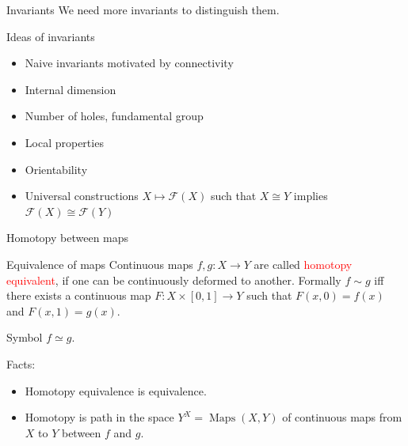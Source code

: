\documentclass[10pt]{beamer}
\DeclareMathOperator{\Maps}{Maps}
\begin{document}
\begin{frame}{Invariants}
We need more invariants to distinguish them.

\end{frame}


\begin{frame}{Ideas of invariants}

\begin{itemize}
  \item Naive invariants motivated by connectivity \pause
  \item Internal dimension \pause
  \item Number of holes, fundamental group \pause
  \item Local properties \pause
  \item Orientability \pause
  \item Universal constructions $X\mapsto \mathcal{F}(X)$ such that $X\cong Y$ implies $\mathcal{F}(X)\cong \mathcal{F}(Y)$
\end{itemize}

\end{frame}

\begin{frame}{Homotopy between maps}

\begin{block}{Equivalence of maps}
Continuous maps $f,g\colon X\to Y$ are called \textcolor{red}{homotopy equivalent}, if one can be continuously deformed to another. Formally $f\sim g$ iff there exists a continuous map $F\colon X\times [0,1]\to Y$ such that $F(x,0)=f(x)$ and $F(x,1)=g(x)$.
\end{block}

Symbol $f\simeq g$. \pause

Facts: 
\begin{itemize}
  \item Homotopy equivalence is equivalence.
  \item Homotopy is path in the space $Y^X=\Maps(X,Y)$ of continuous maps from $X$ to $Y$ between $f$ and $g$.
\end{itemize}

\end{frame}
\end{document}
